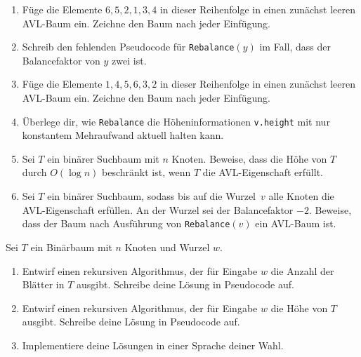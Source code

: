 \documentclass{uebung_cs}
\begin{document}
\begin{aufgabe}\mbox{}
	\begin{enumerate}
		\item \bestehen %
		Füge die Elemente $6, 5, 2, 1, 3, 4$ in dieser Reihenfolge in einen zunächst leeren AVL-Baum ein.
		Zeichne den Baum nach jeder Einfügung.
		\item \bestehen %
		Schreib den fehlenden Pseudocode für \texttt{Rebalance}$(y)$ im Fall, dass der Balancefaktor von $y$ zwei ist.
		\item \bestehen
		Füge die Elemente $1, 4, 5, 6, 3, 2$ in dieser Reihenfolge in einen zunächst leeren AVL-Baum ein.
		Zeichne den Baum nach jeder Einfügung.
		\item \bestehen Überlege dir, wie \texttt{Rebalance} die Höheninformationen \texttt{v.height} mit nur konstantem Mehraufwand aktuell halten kann.
		\item \mittel Sei $T$ ein binärer Suchbaum mit $n$ Knoten.
		Beweise, dass die Höhe von $T$ durch $O(\log n)$ beschränkt ist, wenn $T$ die AVL-Eigenschaft erfüllt.
		\item \note %
    Sei $T$ ein binärer Suchbaum, sodass bis auf die Wurzel~$v$ alle Knoten die AVL-Eigenschaft erfüllen. An der Wurzel sei der Balancefaktor $-2$. Beweise, dass der Baum nach Ausführung von \texttt{Rebalance}$(v)$ ein AVL-Baum ist.
	\end{enumerate}
\end{aufgabe}

\begin{aufgabe}
	Sei $T$ ein Binärbaum mit $n$ Knoten und Wurzel $w$.
	\begin{enumerate}
		\item Entwirf einen rekursiven Algorithmus, der für Eingabe $w$ die Anzahl der Blätter in $T$ ausgibt.
		Schreibe deine Lösung in Pseudocode auf.
		\item Entwirf einen rekursiven Algorithmus, der für Eingabe $w$ die Höhe von $T$ ausgibt.
		Schreibe deine Lösung in Pseudocode auf.
		\item Implementiere deine Lösungen in einer Sprache deiner Wahl.
	\end{enumerate}
\end{aufgabe}
\end{document}
